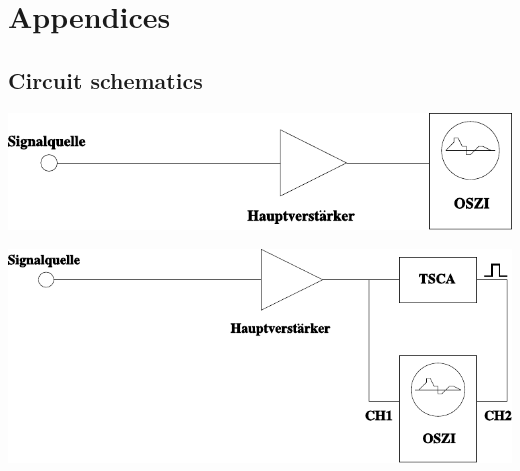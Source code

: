 \newpage
%
\section*{Appendices}
%
\subsection*{Circuit schematics}
%
\vspace{10mm}
%
\begin{multicols}{2}
%
\minipage{\linewidth}
    \begin{center}
        \captionsetup{type=figure}
        \begin{adjustbox}{max width=\linewidth, keepaspectratio}
            \includegraphics[]{pdf/Schaltung1}
        \end{adjustbox}
        \label{fig:Schaltung1}
    \end{center}
\endminipage
%
\vspace{10mm}
%
\minipage{\linewidth}
    \begin{center}
        \captionsetup{type=figure}
        \begin{adjustbox}{max width=\linewidth, keepaspectratio}
            \includegraphics[]{pdf/Schaltung2}
        \end{adjustbox}
        \label{fig:Schaltung2}
    \end{center}
\endminipage
%
\vspace{10mm}
%
\minipage{\linewidth}
    \begin{center}

\end{center}
\end{multicols}
